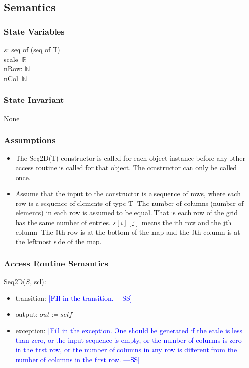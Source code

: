 \documentclass[12pt]{article}
\newcommand{\authornote}[3]{\textcolor{#1}{[#3 ---#2]}}
\newcommand{\authornote}[3]{}
\newcommand{\wss}[1]{\authornote{blue}{SS}{#1}}
\begin{document}
\subsection* {Semantics}

\subsubsection* {State Variables}

$s$: seq of (seq of T)\\
scale: $\mathbb{R}$\\
nRow: $\mathbb{N}$\\
nCol: $\mathbb{N}$

\subsubsection* {State Invariant}

None

\subsubsection* {Assumptions}

\begin{itemize}
\item The Seq2D(T) constructor is called for each object instance before any
other access routine is called for that object.  The constructor can only be
called once.
\item Assume that the input to the constructor is a sequence of rows, where each
  row is a sequence of elements of type T.  The number of columns (number of
  elements) in each row is assumed to be equal. That is each row
  of the grid has the same number of entries.  $s[i][j]$ means the ith row and
  the jth column.  The 0th row is at the bottom of the map and the 0th column
  is at the leftmost side of the map.
\end{itemize}

\subsubsection* {Access Routine Semantics}

Seq2D($S$, scl):
\begin{itemize}
\item transition: \wss{Fill in the transition.}
\item output: $\mathit{out} := \mathit{self}$
\item exception: \wss{Fill in the exception.  One should be generated if the
    scale is less than zero, or the input sequence is empty, or the number of
    columns is zero in the first row, or the number of columns in any row is
    different from the number of columns in the first row.}
\end{itemize}
\end{document}
